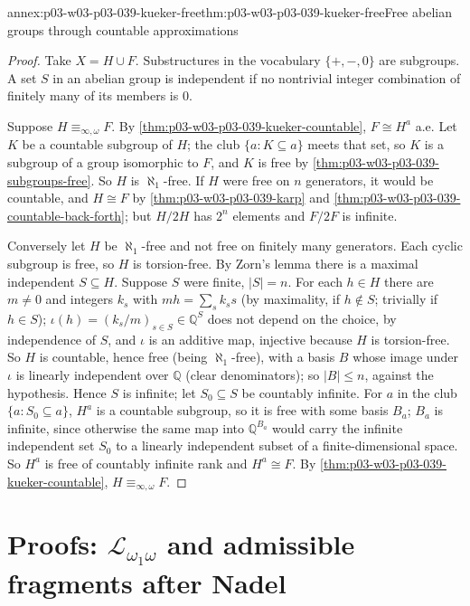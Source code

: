 \begin{annexitem}{annex:p03-w03-p03-039-kueker-free}{thm:p03-w03-p03-039-kueker-free}{Free abelian groups through countable approximations}
\begin{proof}
Take \(X=H\cup F\). Substructures in the vocabulary \(\{+,-,0\}\) are
subgroups. A set \(S\) in an abelian group is independent if no nontrivial
integer combination of finitely many of its members is \(0\).

Suppose \(H\equiv_{\infty,\omega}F\). By
\cref{thm:p03-w03-p03-039-kueker-countable}, \(F\cong H^a\) a.e. Let \(K\)
be a countable subgroup of \(H\); the club \(\{a:K\subseteq a\}\) meets
that set, so \(K\) is a subgroup of a group isomorphic to \(F\), and \(K\)
is free by \cref{thm:p03-w03-p03-039-subgroups-free}. So \(H\) is
\(\aleph_1\)-free. If \(H\) were free on \(n\) generators, it would be
countable, and \(H\cong F\) by \cref{thm:p03-w03-p03-039-karp} and
\cref{thm:p03-w03-p03-039-countable-back-forth}; but \(H/2H\) has \(2^n\)
elements and \(F/2F\) is infinite.

Conversely let \(H\) be \(\aleph_1\)-free and not free on finitely many
generators. Each cyclic subgroup is free, so \(H\) is torsion-free. By
Zorn's lemma there is a maximal independent \(S\subseteq H\). Suppose \(S\)
were finite, \(\lvert S\rvert=n\). For each \(h\in H\) there are \(m\ne0\)
and integers \(k_s\) with \(mh=\sum_sk_ss\) (by maximality, if \(h\notin S\);
trivially if \(h\in S\)); \(\iota(h)=(k_s/m)_{s\in S}\in\mathbb Q^S\) does
not depend on the choice, by independence of \(S\), and \(\iota\) is an
additive map, injective because \(H\) is torsion-free. So \(H\) is
countable, hence free (being \(\aleph_1\)-free), with a basis \(B\) whose
image under \(\iota\) is linearly independent over \(\mathbb Q\) (clear
denominators); so \(\lvert B\rvert\le n\), against the hypothesis. Hence
\(S\) is infinite; let \(S_0\subseteq S\) be countably infinite. For \(a\)
in the club \(\{a:S_0\subseteq a\}\), \(H^a\) is a countable subgroup, so it
is free with some basis \(B_a\); \(B_a\) is infinite, since otherwise the
same map into \(\mathbb Q^{B_a}\) would carry the infinite independent set
\(S_0\) to a linearly independent subset of a finite-dimensional space. So
\(H^a\) is free of countably infinite rank and \(H^a\cong F\). By
\cref{thm:p03-w03-p03-039-kueker-countable}, \(H\equiv_{\infty,\omega}F\).
\end{proof}
\end{annexitem}

\section{Proofs: \texorpdfstring{\(\mathscr L_{\omega_1\omega}\)}{L omega1 omega} and admissible fragments after Nadel}
\label{sec:annex-p03-w03-p03-039-nadel}

